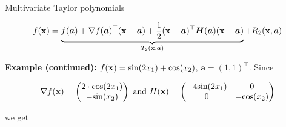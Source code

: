 \begin{vbframe}{Multivariate Taylor polynomials}
\vspace*{-0.7cm}

$$
  f(\mathbf{x}) = \underbrace{f(\bm{a}) + \nabla f(\bm{a})^\top (\mathbf{x} - \bm{a}) + \frac{1}{2}(\mathbf{x} - \bm{a})^\top\bm{H}(\bm{a})(\mathbf{x} - \bm{a})}_{T_2(\mathbf{x}, \bm{a})} + R_2(\mathbf{x}, a) 
$$

\begin{footnotesize}
\textbf{Example (continued):} $f(\mathbf{x}) = \text{sin}(2x_1) + \text{cos}(x_2)$, $\bm{a} = (1, 1)^\top$. Since

$$\nabla f(\mathbf{x}) = \begin{pmatrix} 2\cdot\text{cos}(2x_1) \\ -\text{sin}(x_2) \end{pmatrix}\text{ and } H(\mathbf{x}) = \begin{pmatrix} -4 \text{sin}(2x_1) & 0 \\ 0 & -\text{cos}(x_2) \end{pmatrix} $$
 
we get 

\vspace*{-0.8cm}


\end{footnotesize}
\end{vbframe}
